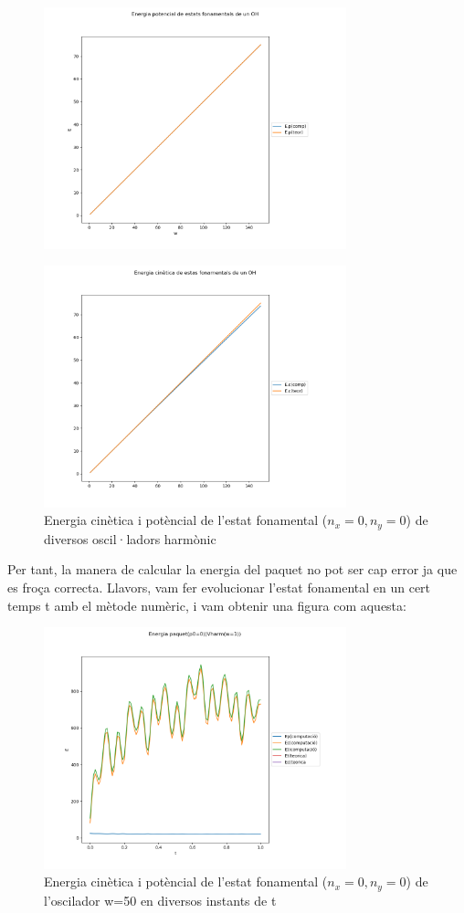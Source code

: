 \documentclass{article}
\begin{document}
\begin{figure}[H]
	\includegraphics[width=\textwidth,height=7cm]{Epotharm.png}
\end{figure}
\begin{figure}[H]
	\includegraphics[width=\textwidth,height=7cm]{Ecinharm.png}
	\caption{Energia cinètica i potèncial de l'estat fonamental (\(n_x=0,n_y=0\)) de diversos oscil·ladors harmònic}
\end{figure}

Per tant, la manera de calcular la energia del paquet no pot ser cap error ja que es froça correcta. Llavors, vam fer evolucionar l'estat fonamental en un
cert temps t amb el mètode numèric, i vam obtenir una figura com aquesta:

\begin{figure}[H]
	\includegraphics[width=\textwidth,height=7cm]{energiaharmdiscretitzat.png}
	\caption{Energia cinètica i potèncial de l'estat fonamental (\(n_x=0,n_y=0\)) de l'oscilador w=50 en diversos instants de t}
\end{figure}
\end{document}
